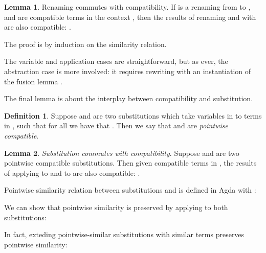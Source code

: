 \documentclass[bsc,frontabs,oneside,singlespacing,parskip,deptreport]{infthesis}
\theoremstyle{definition}
\newtheorem*{definition}{Definition}
\theoremstyle{lemma}
\newtheorem*{lemma}{Lemma}
\begin{document}

\begin{lemma}{Renaming commutes with compatibility.}
  If  is a renaming from  to , and  are
  compatible terms in the context , then the results of renaming
   and  with  are also compatible: .
\end{lemma}

The proof is by induction on the similarity relation.


The variable and application cases are straightforward, but as ever, the
abstraction case is more involved: it requires rewriting with an
instantiation of the fusion lemma .


The final lemma is about the interplay between compatibility and
substitution. 

\begin{definition}
  Suppose  and  are two substitutions which take
  variables  in  to terms in , such that for all
   we have that . Then we say
  that  and  are \textit{pointwise compatible}.
\end{definition}

\begin{lemma}
  \textit{Substitution commutes with compatibility}. Suppose 
  and  are two pointwise compatible substitutions. Then given
  compatible terms  in , the results of applying
   to  and  to  are also compatible:
  .
\end{lemma}

Pointwise similarity relation between substitutions  and 
is defined in Agda with :


We can show that pointwise similarity is preserved by
applying  to both substitutions:


In fact, exteding pointwise-similar substitutions with similar terms 
preserves pointwise similarity:
\end{document}
